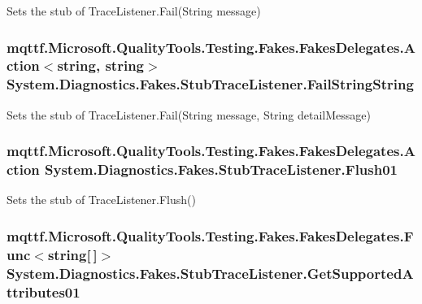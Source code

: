 Sets the stub of Trace\-Listener.\-Fail(\-String message)

\hypertarget{class_system_1_1_diagnostics_1_1_fakes_1_1_stub_trace_listener_ae42dc4582c97a1355a14786cdd413fd9}{
\subsubsection[{Fail\-String\-String}]{\setlength{\rightskip}{0pt plus 5cm}mqttf.\-Microsoft.\-Quality\-Tools.\-Testing.\-Fakes.\-Fakes\-Delegates.\-Action$<$string, string$>$ System.\-Diagnostics.\-Fakes.\-Stub\-Trace\-Listener.\-Fail\-String\-String}}\label{class_system_1_1_diagnostics_1_1_fakes_1_1_stub_trace_listener_ae42dc4582c97a1355a14786cdd413fd9}


Sets the stub of Trace\-Listener.\-Fail(\-String message, String detail\-Message)

\hypertarget{class_system_1_1_diagnostics_1_1_fakes_1_1_stub_trace_listener_a14b80e52c7f2b234770d58730f1a9f2d}{
\subsubsection[{Flush01}]{\setlength{\rightskip}{0pt plus 5cm}mqttf.\-Microsoft.\-Quality\-Tools.\-Testing.\-Fakes.\-Fakes\-Delegates.\-Action System.\-Diagnostics.\-Fakes.\-Stub\-Trace\-Listener.\-Flush01}}\label{class_system_1_1_diagnostics_1_1_fakes_1_1_stub_trace_listener_a14b80e52c7f2b234770d58730f1a9f2d}


Sets the stub of Trace\-Listener.\-Flush()

\hypertarget{class_system_1_1_diagnostics_1_1_fakes_1_1_stub_trace_listener_ab2d5317190a9255913b8c5947ff6c2ce}{
\subsubsection[{Get\-Supported\-Attributes01}]{\setlength{\rightskip}{0pt plus 5cm}mqttf.\-Microsoft.\-Quality\-Tools.\-Testing.\-Fakes.\-Fakes\-Delegates.\-Func$<$string\mbox{[}$\,$\mbox{]}$>$ System.\-Diagnostics.\-Fakes.\-Stub\-Trace\-Listener.\-Get\-Supported\-Attributes01}}\label{class_system_1_1_diagnostics_1_1_fakes_1_1_stub_trace_listener_ab2d5317190a9255913b8c5947ff6c2ce}


